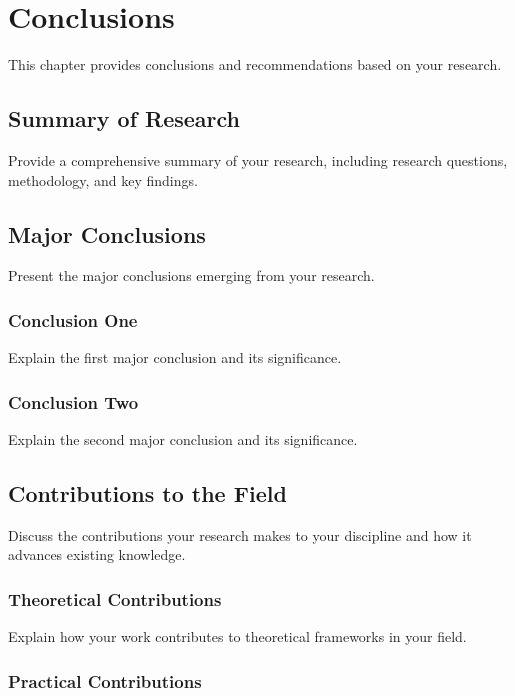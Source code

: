 \chapter{Conclusions}

This chapter provides conclusions and recommendations based on your research.

\section{Summary of Research}

Provide a comprehensive summary of your research, including research questions, methodology, and key findings.

\section{Major Conclusions}

Present the major conclusions emerging from your research.

\subsection{Conclusion One}

Explain the first major conclusion and its significance.

\subsection{Conclusion Two}

Explain the second major conclusion and its significance.

\section{Contributions to the Field}

Discuss the contributions your research makes to your discipline and how it advances existing knowledge.

\subsection{Theoretical Contributions}

Explain how your work contributes to theoretical frameworks in your field.

\subsection{Practical Contributions}

